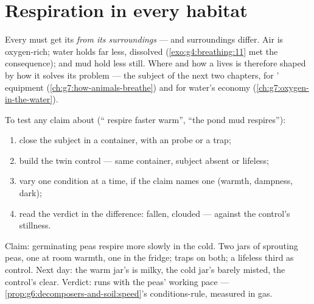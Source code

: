 \section{Respiration in every habitat}

\begin{proposition}\label{prop:g7:what-is-respiration:habitats}
Every  must get its  \emph{from its
surroundings} --- and surroundings differ. Air is
oxygen-rich; water holds far less, dissolved
(\cref{exo:g4:breathing:11} met the consequence);  and
mud hold less still. Where and how a  lives is
therefore shaped by how it solves its  problem ---
the subject of the next two chapters, for '
equipment (\cref{ch:g7:how-animals-breathe}) and for
water's economy (\cref{ch:g7:oxygen-in-the-water}).
\end{proposition}
\admitted

\begin{method}\label{met:g7:what-is-respiration:test}
To test any claim about  (`` respire
faster warm'', ``the pond mud respires''):
\begin{enumerate}
  \item close the subject in a container, with an 
        probe or a  trap;
  \item build the twin control --- same container,
        subject absent or lifeless;
  \item vary one condition at a time, if the claim names
        one (warmth, dampness, dark);
  \item read the verdict in the difference:  fallen,
         clouded --- against the control's
        stillness.
\end{enumerate}
\end{method}

\begin{example}\label{ex:g7:what-is-respiration:coldseed}
Claim: germinating peas respire more slowly in the cold.
Two jars of sprouting peas, one at room warmth, one in the
fridge;  traps on both; a lifeless third as
control. Next day: the warm jar's  is milky, the
cold jar's barely misted, the control's clear. Verdict:
 runs with the peas' working pace ---
\cref{prop:g6:decomposers-and-soil:speed}'s
conditions-rule, measured in gas.
\end{example}


